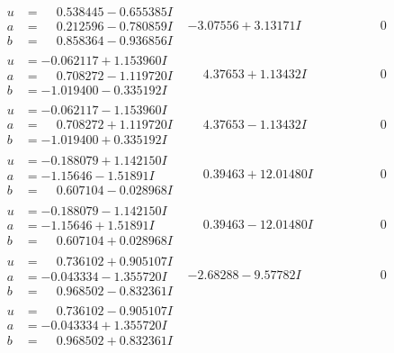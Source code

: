 \documentclass[1p]{elsarticle_modified}
\theoremstyle{definition}
\begin{document}
$$\begin{array}{c|c|c}
\begin{aligned}
u &= \phantom{-}0.538445 - 0.655385 I \\
a &= \phantom{-}0.212596 - 0.780859 I \\
b &= \phantom{-}0.858364 - 0.936856 I\end{aligned}
 & -3.07556 + 3.13171 I & \phantom{-0.000000 } 0 \\ \hline\begin{aligned}
u &= -0.062117 + 1.153960 I \\
a &= \phantom{-}0.708272 - 1.119720 I \\
b &= -1.019400 - 0.335192 I\end{aligned}
 & \phantom{-}4.37653 + 1.13432 I & \phantom{-0.000000 } 0 \\ \hline\begin{aligned}
u &= -0.062117 - 1.153960 I \\
a &= \phantom{-}0.708272 + 1.119720 I \\
b &= -1.019400 + 0.335192 I\end{aligned}
 & \phantom{-}4.37653 - 1.13432 I & \phantom{-0.000000 } 0 \\ \hline\begin{aligned}
u &= -0.188079 + 1.142150 I \\
a &= -1.15646 - 1.51891 I \\
b &= \phantom{-}0.607104 - 0.028968 I\end{aligned}
 & \phantom{-}0.39463 + 12.01480 I & \phantom{-0.000000 } 0 \\ \hline\begin{aligned}
u &= -0.188079 - 1.142150 I \\
a &= -1.15646 + 1.51891 I \\
b &= \phantom{-}0.607104 + 0.028968 I\end{aligned}
 & \phantom{-}0.39463 - 12.01480 I & \phantom{-0.000000 } 0 \\ \hline\begin{aligned}
u &= \phantom{-}0.736102 + 0.905107 I \\
a &= -0.043334 - 1.355720 I \\
b &= \phantom{-}0.968502 - 0.832361 I\end{aligned}
 & -2.68288 - 9.57782 I & \phantom{-0.000000 } 0 \\ \hline\begin{aligned}
u &= \phantom{-}0.736102 - 0.905107 I \\
a &= -0.043334 + 1.355720 I \\
b &= \phantom{-}0.968502 + 0.832361 I\end{aligned}

\end{array}$$
\end{document}
